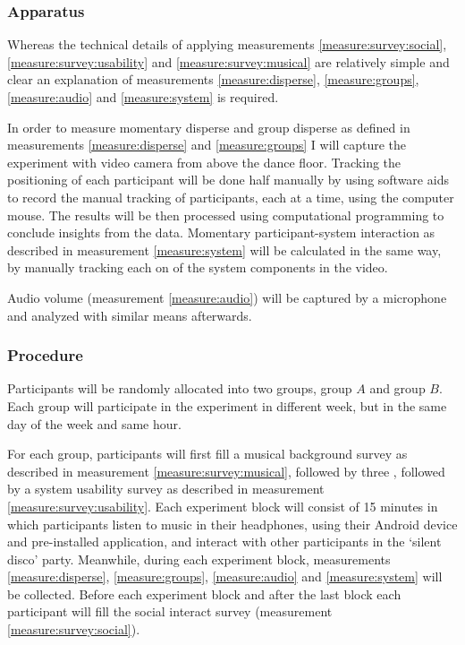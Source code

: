 \subsubsection{Apparatus}

Whereas the technical details of applying measurements \ref{measure:survey:social}, \ref{measure:survey:usability} and \ref{measure:survey:musical} are relatively simple and clear an explanation of measurements \ref{measure:disperse}, \ref{measure:groups}, \ref{measure:audio} and \ref{measure:system} is required.

In order to measure momentary disperse and group disperse as defined in measurements \ref{measure:disperse} and \ref{measure:groups} I will capture the experiment with video camera from above the dance floor. Tracking the positioning of each participant will be done half manually by using software aids to record the manual tracking of participants, each at a time, using the computer mouse. The results will be then processed using computational programming to conclude insights from the data. Momentary participant-system interaction as described in measurement \ref{measure:system} will be calculated in the same way, by manually tracking each on of the system components in the video.

Audio volume (measurement \ref{measure:audio}) will be captured by a microphone and analyzed with similar means afterwards.

\subsubsection{Procedure}

Participants will be randomly allocated into two groups, group $A$ and group $B$\@. Each group will participate in the experiment in different week, but in the same day of the week and same hour.

For each group, participants will first fill a musical background survey as described in measurement \ref{measure:survey:musical}, followed by three , followed by a system usability survey as described in measurement \ref{measure:survey:usability}. Each experiment block will consist of 15 minutes in which participants listen to music in their headphones, using their Android device and pre-installed application, and interact with other participants in the `silent disco' party. Meanwhile, during each experiment block, measurements \ref{measure:disperse}, \ref{measure:groups}, \ref{measure:audio} and \ref{measure:system} will be collected. Before each experiment block and after the last block each participant will fill the social interact survey (measurement \ref{measure:survey:social}).

